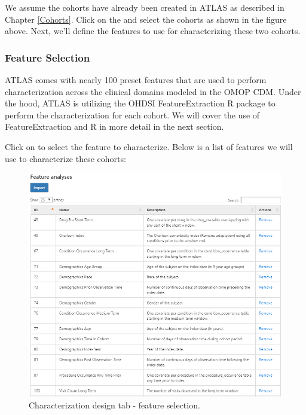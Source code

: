 \documentclass[11pt]{book}
\theoremstyle{definition}
\theoremstyle{definition}
\theoremstyle{definition}
\theoremstyle{remark}
\begin{document}
We assume the cohorts have already been created in ATLAS as described in Chapter \ref{Cohorts}. Click on the and select the cohorts as shown in the figure above. Next, we'll define the features to use for characterizing these two cohorts.

\hypertarget{feature-selection}{%
\subsubsection{Feature Selection}\label{feature-selection}}

ATLAS comes with nearly 100 preset features that are used to perform characterization across the clinical domains modeled in the OMOP CDM. Under the hood, ATLAS is utilizing the OHDSI FeatureExtraction R package to perform the characterization for each cohort. We will cover the use of FeatureExtraction and R in more detail in the next section.

Click on to select the feature to characterize. Below is a list of features we will use to characterize these cohorts:

\begin{figure}

{\centering \includegraphics[width=1\linewidth]{images/Characterization/atlasCharacterizationFeatureSelection} 

}

\caption{Characterization design tab - feature selection.}\label{fig:atlasCharacterizationFeatureSelection}
\end{figure}
\end{document}
